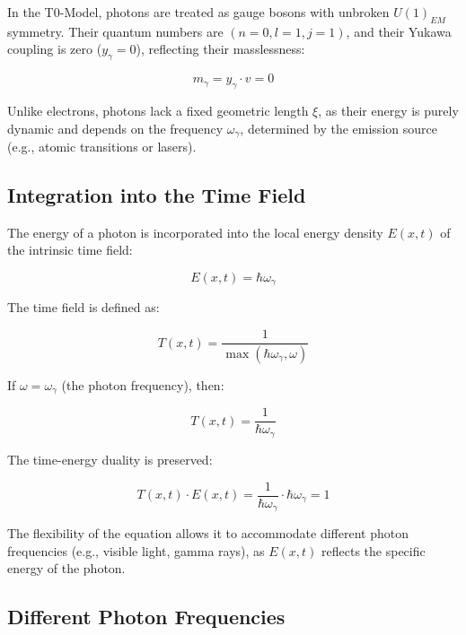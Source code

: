 \documentclass[12pt,a4paper]{article}
\begin{document}
	In the T0-Model, photons are treated as gauge bosons with unbroken \( U(1)_{EM} \) symmetry. Their quantum numbers are \((n=0, l=1, j=1)\), and their Yukawa coupling is zero (\( y_\gamma = 0 \)), reflecting their masslessness:
	
	\begin{equation}
		m_\gamma = y_\gamma \cdot v = 0
	\end{equation}
	
	Unlike electrons, photons lack a fixed geometric length \(\xi\), as their energy is purely dynamic and depends on the frequency \(\omega_\gamma\), determined by the emission source (e.g., atomic transitions or lasers).
	
	\subsection{Integration into the Time Field}
	\label{subsec:photon_time_field}
	
	The energy of a photon is incorporated into the local energy density \( E(x,t) \) of the intrinsic time field:
	
	\begin{equation}
		E(x,t) = \hbar \omega_\gamma
	\end{equation}
	
	The time field is defined as:
	
	\begin{equation}
		T(x,t) = \frac{1}{\max(\hbar \omega_\gamma, \omega)}
	\end{equation}
	
	If \(\omega = \omega_\gamma\) (the photon frequency), then:
	
	\begin{equation}
		T(x,t) = \frac{1}{\hbar \omega_\gamma}
	\end{equation}
	
	The time-energy duality is preserved:
	
	\begin{equation}
		T(x,t) \cdot E(x,t) = \frac{1}{\hbar \omega_\gamma} \cdot \hbar \omega_\gamma = 1
	\end{equation}
	
	The flexibility of the equation allows it to accommodate different photon frequencies (e.g., visible light, gamma rays), as \( E(x,t) \) reflects the specific energy of the photon.
	
	\subsection{Different Photon Frequencies}
	\label{subsec:photon_frequencies}
	
\end{document}

